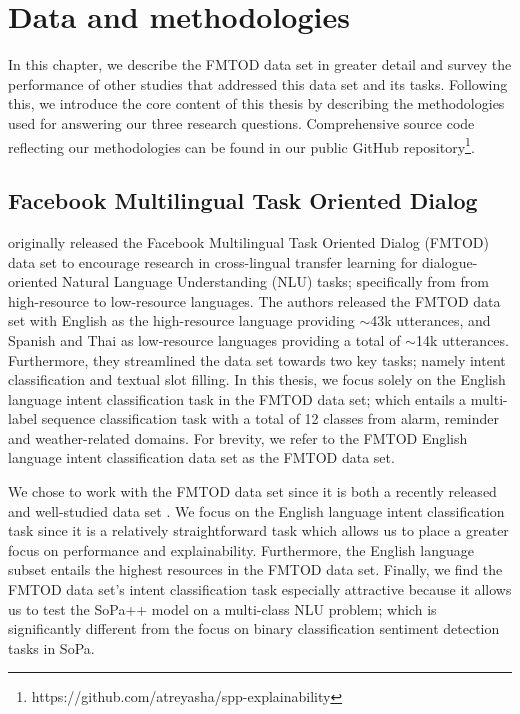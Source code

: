 \chapter{Data and methodologies}

\label{chapter:methodologies}

In this chapter, we describe the FMTOD data set in greater detail and
survey the performance of other studies that addressed this
data set and its tasks. Following this, we introduce the core content of this
thesis by describing the methodologies used for answering our three research
questions. Comprehensive source code reflecting our methodologies can be found
in our public GitHub
repository\footnote{https://github.com/atreyasha/spp-explainability}.

\section{Facebook Multilingual Task Oriented Dialog}

\citet{schuster-etal-2019-cross-lingual} originally released the Facebook
Multilingual Task Oriented Dialog (FMTOD) data set to encourage research in
cross-lingual transfer learning for dialogue-oriented Natural Language
Understanding (NLU) tasks; specifically from from high-resource to low-resource
languages. The authors released the FMTOD data set with English as the
high-resource language providing $\sim$43k utterances, and Spanish and Thai as
low-resource languages providing a total of $\sim$14k utterances. Furthermore,
they streamlined the data set towards two key tasks; namely intent
classification and textual slot filling. In this thesis, we focus solely on the
English language intent classification task in the FMTOD data set; which entails
a multi-label sequence classification task with a total of 12 classes from
alarm, reminder and weather-related domains. For brevity, we refer to the FMTOD
English language intent classification data set as the FMTOD data set.

We chose to work with the FMTOD data set since it is both a recently released
and well-studied data set
\citep{schuster-etal-2019-cross-lingual,zhang2019joint,zhang-etal-2020-intent}.
We focus on the English language intent classification task since it is a
relatively straightforward task which allows us to place a greater focus on
performance and explainability. Furthermore, the English language subset entails
the highest resources in the FMTOD data set. Finally, we find the FMTOD data
set's intent classification task especially attractive because it allows us
to test the SoPa++ model on a multi-class NLU problem; which is significantly
different from the focus on binary classification sentiment detection tasks in
SoPa. 


